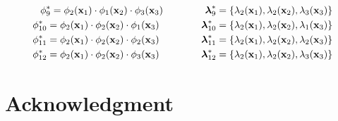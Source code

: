 \documentclass[]{interact}
\theoremstyle{plain}%
\theoremstyle{definition}
\theoremstyle{remark}
\begin{document}
\begin{eqnarray}
%
\phi^{\ast}_9= \phi_{2}(\mathbf{x}_1) \cdot \phi_{1}(\mathbf{x}_2) \cdot \phi_{3}(\mathbf{x}_3) \hspace{1.5cm} \boldsymbol{\lambda}^{\ast}_9= \{\lambda_2(\mathbf{x}_1), \lambda_2(\mathbf{x}_2), \lambda_3(\mathbf{x}_3)\} \nonumber \\
%
\phi^{\ast}_{10}= \phi_{2}(\mathbf{x}_1) \cdot \phi_{2}(\mathbf{x}_2) \cdot \phi_{1}(\mathbf{x}_3) \hspace{1.5cm} \boldsymbol{\lambda}^{\ast}_{10}= \{\lambda_2(\mathbf{x}_1), \lambda_2(\mathbf{x}_2), \lambda_1(\mathbf{x}_3)\} \nonumber \\
%
\phi^{\ast}_{11}= \phi_{2}(\mathbf{x}_1) \cdot \phi_{2}(\mathbf{x}_2) \cdot \phi_{2}(\mathbf{x}_3) \hspace{1.5cm} \boldsymbol{\lambda}^{\ast}_{11}= \{\lambda_2(\mathbf{x}_1), \lambda_2(\mathbf{x}_2), \lambda_2(\mathbf{x}_3)\} \nonumber \\
%
\phi^{\ast}_{12}= \phi_{2}(\mathbf{x}_1) \cdot \phi_{2}(\mathbf{x}_2) \cdot \phi_{3}(\mathbf{x}_3) \hspace{1.5cm} \boldsymbol{\lambda}^{\ast}_{12}= \{\lambda_2(\mathbf{x}_1), \lambda_2(\mathbf{x}_2), \lambda_3(\mathbf{x}_3)\} \nonumber
\end{eqnarray}


\vspace{2mm}
\section*{Acknowledgment}



\end{document}

